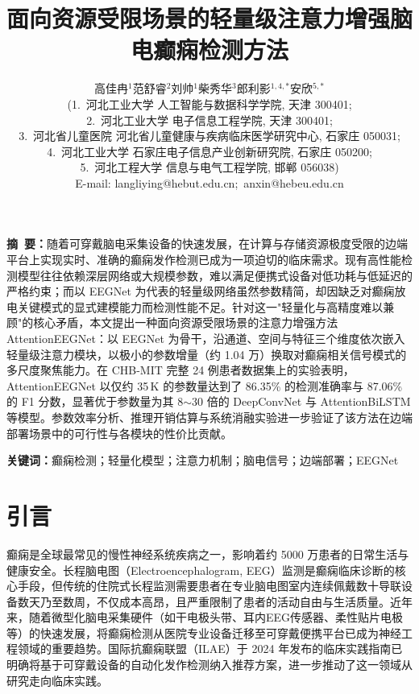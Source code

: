 \documentclass[12pt, a4paper]{article}
\title{\heiti 面向资源受限场景的轻量级注意力增强脑电癫痫检测方法}
\author{
高佳冉$^{1}$\quad 范舒睿$^{2}$\quad 刘帅$^{1}$\quad 柴秀华$^{3}$\quad 郎利影$^{1,4,*}$\quad 安欣$^{5,*}$\\[6pt]
\small (1.~河北工业大学 人工智能与数据科学学院, 天津 300401;\\
\small 2.~河北工业大学 电子信息工程学院, 天津 300401;\\
\small 3.~河北省儿童医院 河北省儿童健康与疾病临床医学研究中心, 石家庄 050031;\\
\small 4.~河北工业大学 石家庄电子信息产业创新研究院, 石家庄 050200;\\
\small 5.~河北工程大学 信息与电气工程学院, 邯郸 056038)\\[4pt]
\small E-mail: langliying@hebut.edu.cn;~anxin@hebeu.edu.cn
}
\date{}
\begin{document}
\maketitle

\begin{center}
\begin{minipage}{0.92\textwidth}
\noindent\textbf{摘\ 要：}\;随着可穿戴脑电采集设备的快速发展，在计算与存储资源极度受限的边端平台上实现实时、准确的癫痫发作检测已成为一项迫切的临床需求。现有高性能检测模型往往依赖深层网络或大规模参数，难以满足便携式设备对低功耗与低延迟的严格约束；而以 EEGNet 为代表的轻量级网络虽然参数精简，却因缺乏对癫痫放电关键模式的显式建模能力而检测性能不足。针对这一"轻量化与高精度难以兼顾"的核心矛盾，本文提出一种面向资源受限场景的注意力增强方法 AttentionEEGNet：以 EEGNet 为骨干，沿通道、空间与特征三个维度依次嵌入轻量级注意力模块，以极小的参数增量（约 1.04 万）换取对癫痫相关信号模式的多尺度聚焦能力。在 CHB-MIT 完整 24 例患者数据集上的实验表明，AttentionEEGNet 以仅约 35\,K 的参数量达到了 86.35\% 的检测准确率与 87.06\% 的 F1 分数，显著优于参数量为其 8$\sim$30 倍的 DeepConvNet 与 AttentionBiLSTM 等模型。参数效率分析、推理开销估算与系统消融实验进一步验证了该方法在边端部署场景中的可行性与各模块的性价比贡献。

\vspace{6pt}
\noindent\textbf{关键词：}\;癫痫检测；轻量化模型；注意力机制；脑电信号；边端部署；EEGNet
\end{minipage}
\end{center}

\section{引言}

癫痫是全球最常见的慢性神经系统疾病之一，影响着约 5000 万患者的日常生活与健康安全\cite{ref_fisher2017}。长程脑电图（Electroencephalogram, EEG）监测是癫痫临床诊断的核心手段\cite{ref_acharya2018}，但传统的住院式长程监测需要患者在专业脑电图室内连续佩戴数十导联设备数天乃至数周，不仅成本高昂，且严重限制了患者的活动自由与生活质量。近年来，随着微型化脑电采集硬件（如干电极头带、耳内EEG传感器、柔性贴片电极等）的快速发展\cite{ref_roy2019}，将癫痫检测从医院专业设备迁移至可穿戴便携平台已成为神经工程领域的重要趋势。国际抗癫痫联盟（ILAE）于 2024 年发布的临床实践指南已明确将基于可穿戴设备的自动化发作检测纳入推荐方案\cite{ref_beniczky2024}，进一步推动了这一领域从研究走向临床实践。
\end{document}
